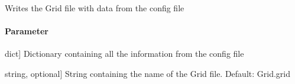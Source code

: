 \documentclass[letterpaper,10pt,english]{sphinxmanual}
\begin{document}

\begin{fulllineitems}
\label{\detokenize{functions:sir.write_grid_mc}}
\pysigstartsignatures
{}
\pysigstopsignatures
\sphinxAtStartPar
Writes the Grid file with data from the config file


\paragraph{Parameter}
\label{\detokenize{functions:id25}}\begin{description}
\sphinxlineitem{config}{[}dict{]}
\sphinxAtStartPar
Dictionary containing all the information from the config file

\sphinxlineitem{filename}{[}string, optional{]}
\sphinxAtStartPar
String containing the name of the Grid file. Default: Grid.grid

\end{description}

\end{fulllineitems}

\end{document}
